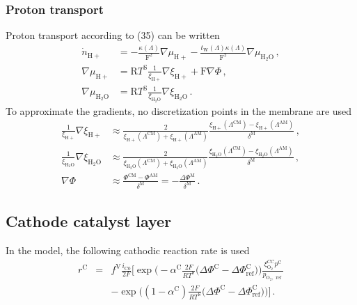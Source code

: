 \documentclass[pdftex,a4paper, 12pt]{article}
\begin{document}
\subsubsection*{Proton transport}
%
Proton transport according to (35) \cite{Mangold2010} can be written
%
\begin{align}
	\dot{n}_{\mathrm{H+}} &= - \frac{\kappa(\mathit{\Lambda})}{\mathrm{F}^2} \nabla\mu_{\mathrm{H+}} - \frac{t_{\mathrm{W}}(\mathit{\Lambda})\kappa(\mathit{\Lambda})}{\mathrm{F}^2} \nabla\mu_{\mathrm{H_2O}} \, ,\\
	\nabla\mu_{\mathrm{H+}} &= \mathrm{R}T^{\mathrm{S}} \frac{1}{\xi_{\mathrm{H+}}}\nabla\xi_{\mathrm{H+}}+\mathrm{F}\nabla\mathit{\Phi} \, ,\\
	\nabla\mu_{\mathrm{H_2O}} &= \mathrm{R}T^{\mathrm{S}} \frac{1}{\xi_{\mathrm{H_2O}}}\nabla\xi_{\mathrm{H_2O}} \, .
\end{align}
%
To approximate the gradients, no discretization points in the membrane are used
%
\begin{align}
	\frac{1}{\xi_{\mathrm{H+}}}\nabla\xi_{\mathrm{H+}} &\approx \frac{2}{ \xi_{\mathrm{H+}}(\mathit{\Lambda}^{\mathrm{CM}})+\xi_{\mathrm{H+}}(\mathit{\Lambda}^{\mathrm{AM}}) } \frac{\xi_{\mathrm{H+}}(\mathit{\Lambda}^{\mathrm{CM}})-\xi_{\mathrm{H+}}(\mathit{\Lambda}^{\mathrm{AM}})}{\delta^{\mathrm{M}}} \, ,\\
	\frac{1}{\xi_{\mathrm{H_2O}}}\nabla\xi_{\mathrm{H_2O}} &\approx \frac{2}{ \xi_{\mathrm{H_2O}}(\mathit{\Lambda}^{\mathrm{CM}})+\xi_{\mathrm{H_2O}}(\mathit{\Lambda}^{\mathrm{AM}}) } \frac{\xi_{\mathrm{H_2O}}(\mathit{\Lambda}^{\mathrm{CM}})-\xi_{\mathrm{H_2O}}(\mathit{\Lambda}^{\mathrm{AM}})}{\delta^{\mathrm{M}}} \, ,\\
	\nabla\mathit{\Phi} &\approx \frac{\mathit{\Phi}^{\mathrm{CM}}-\mathit{\Phi}^{\mathrm{AM}}}{\delta^{\mathrm{M}}} = - \frac{\Delta \mathit{\Phi}^{\mathrm{M}}}{\delta^{\mathrm{M}}} \, .
\end{align}
%
%
%
\subsection{Cathode catalyst layer}
%
%
In the model, the following cathodic reaction rate is used
%
\begin{eqnarray}
	r^{\mathrm{C}} &=& f^{\mathrm{V}} \frac{i_{\mathrm{C 0}}}{2 F} 
	\Big[\exp \Big( -\alpha^{\mathrm{C}} \frac{2 F}{R T^{\mathrm{S}}} \big( \Delta \mathit{\Phi}^{\mathrm{C}} - \Delta \mathit{\Phi}_{\mathrm{ref}}^{\mathrm{C}} \big)\Big) \frac{\xi_{\mathrm{O}_{2}}^{C C} p^{\mathrm{C}}}{p_{\mathrm{O}_{2}, \text { ref }}}  \nonumber \\
	&&- \exp \Big( (1-\alpha^{\mathrm{C}}) \frac{2 F}{R T^{\mathrm{S}}} \big( \Delta \mathit{\Phi}^{\mathrm{C}} - \Delta \mathit{\Phi}_{\mathrm{ref}}^{\mathrm{C}} \big) \Big) \Big] \, .
\end{eqnarray}
%
%
\end{document}
